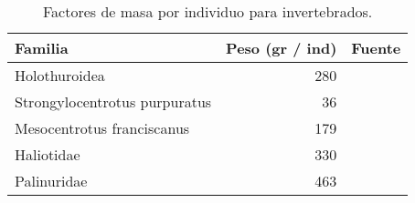 \begin{table}

\caption{\label{tab:w_fact}Factores de masa por individuo para invertebrados.}
\centering
\begin{tabular}[t]{lrl}
\toprule
Familia & Peso (gr / ind) & Fuente\\
\midrule
Holothuroidea & 280 & \cite{chavez2011stock}\\
Strongylocentrotus purpuratus & 36 & \cite{smith2021variation,dof_erizo}\\
Mesocentrotus franciscanus & 179 & \cite{leus2014framework,dof_erizo}\\
Haliotidae & 330 & \cite{rossetto2013reproductive,dof_abulon}\\
Palinuridae & 463 & \cite{neilson2011assessment,dof_langosta}\\
\bottomrule
\end{tabular}
\end{table}